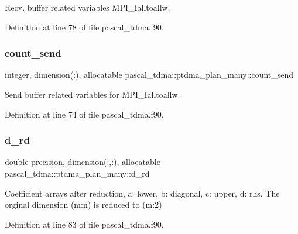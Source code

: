 Recv. buffer related variables M\+P\+I\+\_\+\+Ialltoallw. 



Definition at line 78 of file pascal\+\_\+tdma.\+f90.

\mbox{\label{structpascal__tdma_1_1ptdma__plan__many_ab7a5a4be85650cfe4dfc30fd83b132d7}} 
\subsubsection{\texorpdfstring{count\_send}{count\_send}}
{\footnotesize\ttfamily integer, dimension(\+:), allocatable pascal\+\_\+tdma\+::ptdma\+\_\+plan\+\_\+many\+::count\+\_\+send}



Send buffer related variables for M\+P\+I\+\_\+\+Ialltoallw. 



Definition at line 74 of file pascal\+\_\+tdma.\+f90.

\mbox{\label{structpascal__tdma_1_1ptdma__plan__many_aa1054814f874504a77ad17a838a80fd2}} 
\subsubsection{\texorpdfstring{d\_rd}{d\_rd}}
{\footnotesize\ttfamily double precision, dimension(\+:,\+:), allocatable pascal\+\_\+tdma\+::ptdma\+\_\+plan\+\_\+many\+::d\+\_\+rd}



Coefficient arrays after reduction, a\+: lower, b\+: diagonal, c\+: upper, d\+: rhs. The orginal dimension (m\+:n) is reduced to (m\+:2) 



Definition at line 83 of file pascal\+\_\+tdma.\+f90.

\mbox{\label{structpascal__tdma_1_1ptdma__plan__many_af0941ce4b9206c36a3a059d2bae84d2b}} 
